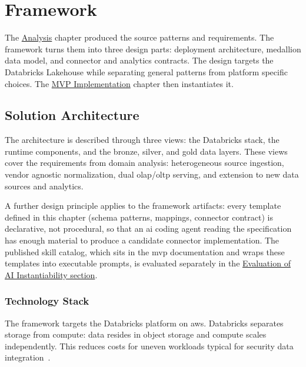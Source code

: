 \chapter{Framework}
\label{ch:framework}

The \hyperref[ch:analysis]{Analysis} chapter produced the source patterns and requirements. The framework turns them into three design parts: deployment architecture, medallion data model, and connector and analytics contracts. The design targets the Databricks Lakehouse while separating general patterns from platform specific choices. The \hyperref[ch:implementation]{MVP Implementation} chapter then instantiates it.


\section{Solution Architecture}

The architecture is described through three views: the Databricks stack, the runtime components, and the bronze, silver, and gold data layers. These views cover the requirements from domain analysis: heterogeneous source ingestion, vendor agnostic normalization, dual \gls{olap}/\gls{oltp} serving, and extension to new data sources and analytics.

A further design principle applies to the framework artifacts: every template defined in this chapter (schema patterns, mappings, connector contract) is declarative, not procedural, so that an \gls{ai} coding agent reading the specification has enough material to produce a candidate connector implementation. The published skill catalog, which sits in the \gls{mvp} documentation and wraps these templates into executable prompts, is evaluated separately in the \hyperref[sec:ai-eval]{Evaluation of AI Instantiability section}.


\subsection{Technology Stack}
\label{sec:tech-stack}

The framework targets the Databricks platform on \gls{aws}. Databricks separates storage from compute: data resides in object storage and compute scales independently. This reduces costs for uneven workloads typical for security data integration~\cite{Armbrust2021}.

